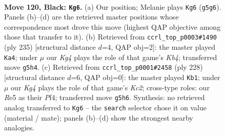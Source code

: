 \documentclass[11pt]{article}
\begin{document}
\begin{figure}[p]\centering
\begin{subfigure}{0.46\textwidth}\centering
\resizebox{\linewidth}{!}{%
\newchessgame
\chessboard[
  setfen={6K1/8/8/4r1k1/8/8/8/8 b - - 25 120},
  showmover=false,
  pgfstyle=straightmove, color=movearrow, markmove={g5-g6}
]}
\caption{}
\end{subfigure}\hfill
\begin{subfigure}{0.46\textwidth}\centering
\resizebox{\linewidth}{!}{%
\newchessgame
\chessboard[
  setfen={8/1r6/3K4/1k6/8/4Q3/8/8 b - - 12 118},
  showmover=false,
  pgfstyle=straightmove, color=movearrow, markmove={b5-a4}
]}
\caption{}
\end{subfigure}
\\[4pt]
\begin{subfigure}{0.46\textwidth}\centering
\resizebox{\linewidth}{!}{%
\newchessgame
\chessboard[
  setfen={8/8/8/2k5/5P2/8/2K5/8 w - - 0 115},
  showmover=false,
  pgfstyle=straightmove, color=movearrow, markmove={c2-b1}
]}
\caption{}
\end{subfigure}\hfill

\caption{\textbf{Move 120, Black: \texttt{Kg6}.} (a) Our position; Melanie plays \texttt{Kg6} (\texttt{g5g6}). Panels (b)--(d) are the retrieved master positions whose correspondence most drove this move (highest QAP objective among those that transfer to it). (b) Retrieved from \texttt{ccrl\_top\_p0003\#1490} (ply 235) [structural distance $d$=4, QAP obj=2]: the master played \texttt{Ka4}; under $\mu$ our \emph{Kg4} plays the role of that game's \emph{Kb4}; transferred move \texttt{g5h4}. (c) Retrieved from \texttt{ccrl\_top\_p0001\#2458} (ply 228) [structural distance $d$=6, QAP obj=0]: the master played \texttt{Kb1}; under $\mu$ our \emph{Kg4} plays the role of that game's \emph{Kc2}; cross-type roles: our \emph{R}e5 as their \emph{P}f4; transferred move \texttt{g5h6}. Synthesis: no retrieved analog transferred to \texttt{Kg6} -- the \texttt{search} selector chose it on value (material / mate); panels (b)--(d) show the strongest nearby analogies.}
\label{fig:thought-m239}
\end{figure}

\clearpage
\end{document}

